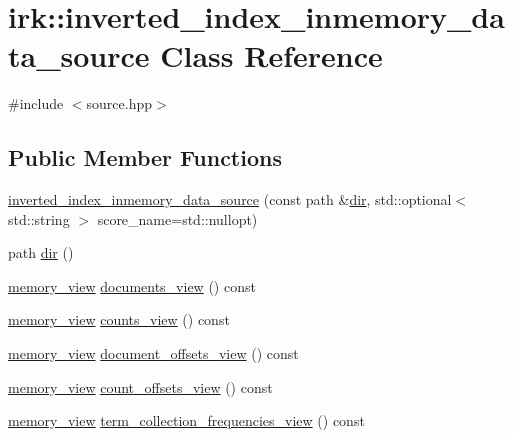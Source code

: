 \hypertarget{classirk_1_1inverted__index__inmemory__data__source}{}\section{irk\+:\+:inverted\+\_\+index\+\_\+inmemory\+\_\+data\+\_\+source Class Reference}
\label{classirk_1_1inverted__index__inmemory__data__source}


{\ttfamily \#include $<$source.\+hpp$>$}

\subsection*{Public Member Functions}
\begin{DoxyCompactItemize}
\item 
\mbox{\hyperlink{classirk_1_1inverted__index__inmemory__data__source_a74ce35ed43f4ea13b3efbd5299eae2e0}{inverted\+\_\+index\+\_\+inmemory\+\_\+data\+\_\+source}} (const path \&\mbox{\hyperlink{classirk_1_1inverted__index__inmemory__data__source_a4835600c96a23706488f4ffe001e3d35}{dir}}, std\+::optional$<$ std\+::string $>$ score\+\_\+name=std\+::nullopt)
\item 
path \mbox{\hyperlink{classirk_1_1inverted__index__inmemory__data__source_a4835600c96a23706488f4ffe001e3d35}{dir}} ()
\item 
\mbox{\hyperlink{classirk_1_1memory__view}{memory\+\_\+view}} \mbox{\hyperlink{classirk_1_1inverted__index__inmemory__data__source_a41dc61993c37b154efbcd407d9fc2df3}{documents\+\_\+view}} () const
\item 
\mbox{\hyperlink{classirk_1_1memory__view}{memory\+\_\+view}} \mbox{\hyperlink{classirk_1_1inverted__index__inmemory__data__source_affa722e35cb0a81d77ce39659eb66c4c}{counts\+\_\+view}} () const
\item 
\mbox{\hyperlink{classirk_1_1memory__view}{memory\+\_\+view}} \mbox{\hyperlink{classirk_1_1inverted__index__inmemory__data__source_ade1875951de679832af1f730c2e4fb99}{document\+\_\+offsets\+\_\+view}} () const
\item 
\mbox{\hyperlink{classirk_1_1memory__view}{memory\+\_\+view}} \mbox{\hyperlink{classirk_1_1inverted__index__inmemory__data__source_ab1532e134ecfec7e6bfc9563bc403360}{count\+\_\+offsets\+\_\+view}} () const
\item 
\mbox{\hyperlink{classirk_1_1memory__view}{memory\+\_\+view}} \mbox{\hyperlink{classirk_1_1inverted__index__inmemory__data__source_a5ddbe15d3b64a4278c243f3d9792b7bf}{term\+\_\+collection\+\_\+frequencies\+\_\+view}} () const

\end{DoxyCompactItemize}

